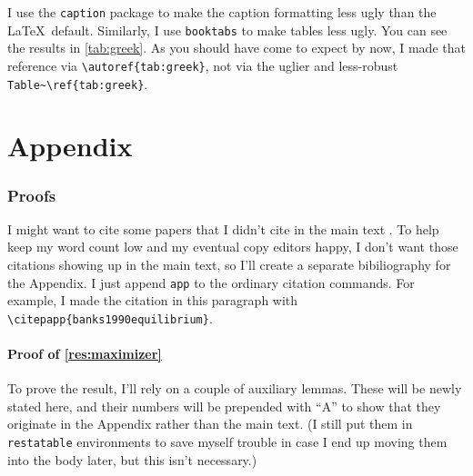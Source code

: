 \documentclass[12pt]{article}
\begin{document}
I use the \verb|caption| package to make the caption formatting less ugly than the \LaTeX\ default.
Similarly, I use \verb|booktabs| to make tables less ugly.
You can see the results in \autoref{tab:greek}.
As you should have come to expect by now, I made that reference via \verb|\autoref{tab:greek}|, not via the uglier and less-robust \verb|Table~\ref{tab:greek}|.


\singlespacing





\clearpage
\appendix
\onehalfspacing

\renewcommand{\partname}{}
\renewcommand{\thepart}{}
\part{Appendix}
\localtableofcontents

\setcounter{page}{1}
\setcounter{lemma}{0}
\setcounter{corollary}{0}
\setcounter{proposition}{0}
\setcounter{equation}{0}

\renewcommand{\thelemma}{A.\arabic{lemma}}
\renewcommand{\thecorollary}{A.\arabic{corollary}}
\renewcommand{\theproposition}{A.\arabic{proposition}}
\renewcommand{\theequation}{A.\arabic{equation}}
\renewcommand{\thefigure}{A.\arabic{figure}}
\renewcommand{\thetable}{A.\arabic{table}}

\section{Proofs}

I might want to cite some papers that I didn't cite in the main text .
To help keep my word count low and my eventual copy editors happy, I don't want those citations showing up in the main text, so I'll create a separate bibiliography for the Appendix.
I just append \verb|app| to the ordinary citation commands.
For example, I made the citation in this paragraph with \verb|\citepapp{banks1990equilibrium}|.

\subsection{Proof of \autoref{res:maximizer}}

To prove the result, I'll rely on a couple of auxiliary lemmas.
These will be newly stated here, and their numbers will be prepended with ``A'' to show that they originate in the Appendix rather than the main text.
(I still put them in \verb|restatable| environments to save myself trouble in case I end up moving them into the body later, but this isn't necessary.)
\end{document}
